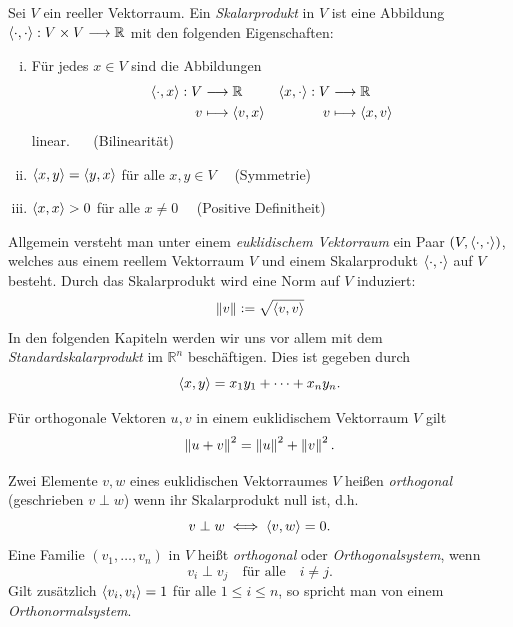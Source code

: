 \begin{defn}
Sei $V$ ein reeller Vektorraum. Ein \textit{Skalarprodukt} in $V$ ist eine Abbildung $\langle \cdot, \cdot \rangle: V \times V \longrightarrow \mathbb{R}$ mit den folgenden Eigenschaften:
\begin{enumerate}[(i)]
\item Für jedes $x \in V$ sind die Abbildungen
\begin{align*}
\langle \cdot, x \rangle: V & \longrightarrow \mathbb{R} & \langle x, \cdot \rangle: V & \longrightarrow \mathbb{R}\\
v & \longmapsto \langle v, x \rangle & v & \longmapsto \langle x, v \rangle
\end{align*}
linear. $\quad$ (Bilinearität)
\item $\langle x, y \rangle = \langle y, x \rangle$ für alle  $x,y \in V \quad$ (Symmetrie)
\item $\langle x, x \rangle > 0$ für alle $x \neq 0 \quad$ (Positive Definitheit)
\end{enumerate}
\end{defn}

Allgemein versteht man unter einem \textit{euklidischem Vektorraum} ein Paar $(V, \langle \cdot, \cdot \rangle)$, welches aus einem reellem Vektorraum $V$ und einem Skalarprodukt $\langle \cdot, \cdot \rangle$ auf $V$ besteht. Durch das Skalarprodukt wird eine Norm auf $V$ induziert:
$$\left\lVert v \right\rVert \vcentcolon= \sqrt{\langle v, v \rangle}$$
In den folgenden Kapiteln werden wir uns vor allem mit dem \textit{Standardskalarprodukt} im $\mathbb{R}^n$ beschäftigen. Dies ist gegeben durch 
$$\langle x, y \rangle = x_1y_1 + \cdots + x_ny_n.$$

\begin{thm}
\label{pythagoras}
Für orthogonale Vektoren $u,v$ in einem euklidischem Vektorraum $V$ gilt
$$\left\lVert u+v \right\rVert^2 = \left\lVert u \right\rVert^2 + \left\lVert v \right\rVert^2.$$
\end{thm}

\begin{defn}
Zwei Elemente $v, w$ eines euklidischen Vektorraumes $V$ heißen \textit{orthogonal} (geschrieben $v \perp w$) wenn ihr Skalarprodukt null ist, d.h.
$$v \perp w \iff \langle v, w \rangle = 0.$$
Eine Familie $(v_1, \ldots, v_n)$ in $V$ heißt \textit{orthogonal} oder \textit{Orthogonalsystem}, wenn
$$v_i \perp v_j \quad \text{für alle} \quad i \neq j.$$
Gilt zusätzlich $\langle v_i, v_i \rangle = 1$ für alle $1 \leq i \leq n$, so spricht man von einem \textit{Orthonormalsystem}.
\end{defn}

